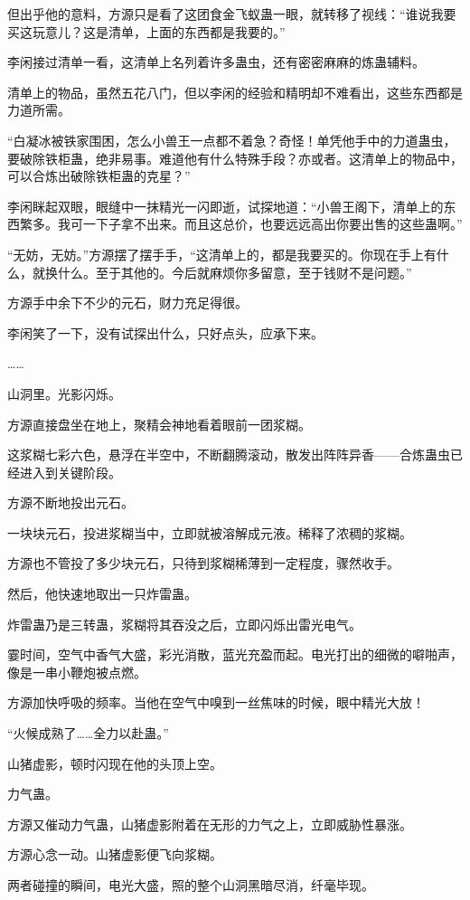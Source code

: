 \begin{this_body}
但出乎他的意料，方源只是看了这团食金飞蚁蛊一眼，就转移了视线：“谁说我要买这玩意儿？这是清单，上面的东西都是我要的。”

李闲接过清单一看，这清单上名列着许多蛊虫，还有密密麻麻的炼蛊辅料。

清单上的物品，虽然五花八门，但以李闲的经验和精明却不难看出，这些东西都是力道所需。

“白凝冰被铁家围困，怎么小兽王一点都不着急？奇怪！单凭他手中的力道蛊虫，要破除铁柜蛊，绝非易事。难道他有什么特殊手段？亦或者。这清单上的物品中，可以合炼出破除铁柜蛊的克星？”

李闲眯起双眼，眼缝中一抹精光一闪即逝，试探地道：“小兽王阁下，清单上的东西繁多。我可一下子拿不出来。而且这总价，也要远远高出你要出售的这些蛊啊。”

“无妨，无妨。”方源摆了摆手手，“这清单上的，都是我要买的。你现在手上有什么，就换什么。至于其他的。今后就麻烦你多留意，至于钱财不是问题。”

方源手中余下不少的元石，财力充足得很。

李闲笑了一下，没有试探出什么，只好点头，应承下来。

……

山洞里。光影闪烁。

方源直接盘坐在地上，聚精会神地看着眼前一团浆糊。

这浆糊七彩六色，悬浮在半空中，不断翻腾滚动，散发出阵阵异香——合炼蛊虫已经进入到关键阶段。

方源不断地投出元石。

一块块元石，投进浆糊当中，立即就被溶解成元液。稀释了浓稠的浆糊。

方源也不管投了多少块元石，只待到浆糊稀薄到一定程度，骤然收手。

然后，他快速地取出一只炸雷蛊。

炸雷蛊乃是三转蛊，浆糊将其吞没之后，立即闪烁出雷光电气。

霎时间，空气中香气大盛，彩光消散，蓝光充盈而起。电光打出的细微的噼啪声，像是一串小鞭炮被点燃。

方源加快呼吸的频率。当他在空气中嗅到一丝焦味的时候，眼中精光大放！

“火候成熟了……全力以赴蛊。”

山猪虚影，顿时闪现在他的头顶上空。

力气蛊。

方源又催动力气蛊，山猪虚影附着在无形的力气之上，立即威胁性暴涨。

方源心念一动。山猪虚影便飞向浆糊。

两者碰撞的瞬间，电光大盛，照的整个山洞黑暗尽消，纤毫毕现。


\end{this_body}
